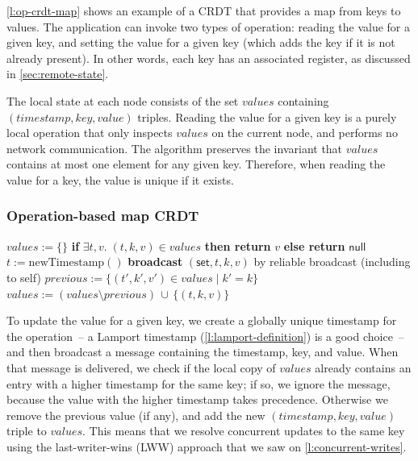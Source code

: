 \autoref{l:op-crdt-map} shows an example of a CRDT that provides a map from keys to values.
The application can invoke two types of operation: reading the value for a given key, and setting the value for a given key (which adds the key if it is not already present).
In other words, each key has an associated register, as discussed in \autoref{sec:remote-state}.

The local state at each node consists of the set $\mathit{values}$ containing $(\mathit{timestamp}, \mathit{key}, \mathit{value})$ triples.
Reading the value for a given key is a purely local operation that only inspects $\mathit{values}$ on the current node, and performs no network communication.
The algorithm preserves the invariant that $\mathit{values}$ contains at most one element for any given key.
Therefore, when reading the value for a key, the value is unique if it exists.

\begin{frame}
    \label{s:op-crdt-map}
    \frametitle{Operation-based map CRDT}
    \footnotesize
    \begin{algorithmic}
            \State $\mathit{values} := \{\}$
        \EndOn
        \State
            \State \textbf{if} $\exists t,v.\; (t,k,v) \in \mathit{values}$ \textbf{then return} $v$ \textbf{else return} $\mathsf{null}$
        \EndOn
        \State
            \State $t := \mathrm{newTimestamp}()$ 
            \State \textbf{broadcast} $(\mathsf{set}, t, k, v)$ by reliable broadcast (including to self)
        \EndOn
        \State
            \State $\mathit{previous} := \{(t',k',v') \in \mathit{values} \mid k' = k\}$
                \State $\mathit{values} := (\mathit{values} \setminus \mathit{previous}) \,\cup\, \{(t,k,v)\}$
            \EndIf
        \EndOn
    \end{algorithmic}
\end{frame}
\label{l:op-crdt-map}

To update the value for a given key, we create a globally unique timestamp for the operation~-- a Lamport timestamp (\autoref{l:lamport-definition}) is a good choice~-- and then broadcast a message containing the timestamp, key, and value.
When that message is delivered, we check if the local copy of $\mathit{values}$ already contains an entry with a higher timestamp for the same key; if so, we ignore the message, because the value with the higher timestamp takes precedence.
Otherwise we remove the previous value (if any), and add the new $(\mathit{timestamp}, \mathit{key}, \mathit{value})$ triple to $\mathit{values}$.
This means that we resolve concurrent updates to the same key using the last-writer-wins (LWW) approach that we saw on \autoref{l:concurrent-writes}.


